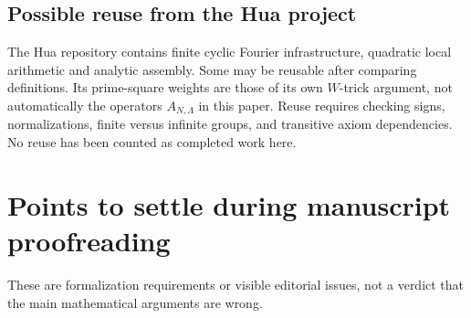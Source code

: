 \documentclass[11pt]{article}
\newcommand{\page}{\newpage}
\begin{document}
\subsection*{Possible reuse from the Hua project}
The Hua repository contains finite cyclic Fourier infrastructure, quadratic local
arithmetic and analytic assembly. Some may be reusable after comparing
definitions. Its prime-square weights are those of its own \(W\)-trick argument,
not automatically the operators \(A_{N,\Lambda}\) in this paper. Reuse requires
checking signs, normalizations, finite versus infinite groups, and transitive
axiom dependencies. No reuse has been counted as completed work here.

\page
\section{Points to settle during manuscript proofreading}
These are formalization requirements or visible editorial issues, not a verdict
that the main mathematical arguments are wrong.
\end{document}
